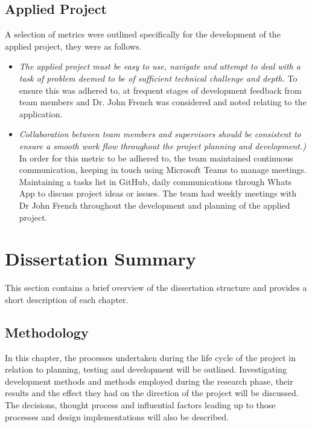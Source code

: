 \subsection{Applied Project}
A selection of metrics were outlined specifically for the development of the applied project, they were as follows.

\begin{itemize}

    \item \emph{The applied project must be easy to use, navigate and attempt to deal with a task of problem deemed to be of sufficient technical challenge and depth.} To ensure this was adhered to, at frequent stages of development feedback from team members and Dr. John French was considered and noted relating to the application.

    \item \emph{Collaboration between team members and supervisors should be consistent to ensure a smooth work flow throughout the project planning and development.)} In order for this metric to be adhered to, the team maintained continuous communication, keeping in touch using Microsoft Teams to manage meetings. Maintaining a tasks list in GitHub, daily communications through Whats App to discuss project ideas or issues.
    The team had weekly meetings with Dr John French throughout the development and planning of the applied project.

\end{itemize}

\section{Dissertation Summary}
This section contains a brief overview of the dissertation structure and provides a short description of each chapter.

\subsection{Methodology}
In this chapter, the processes undertaken during the life cycle of the project in relation to planning, testing and development will be outlined. Investigating development methods and methods employed during the research phase, their results and the effect they had on the direction of the project will be discussed. The decisions, thought process and influential factors leading up to those processes and design implementations will also be described.

